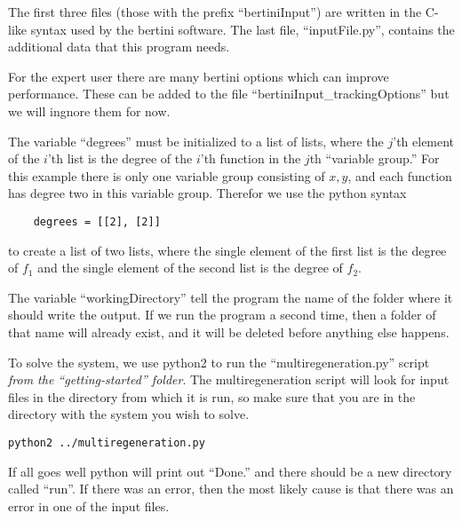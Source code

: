 \documentclass[12pt]{article}
\begin{document}
The first three files (those with the prefix ``bertiniInput'') are 
written in the C-like syntax used by the bertini software. The last 
file, ``inputFile.py'', contains the additional data that this 
program needs.

For the expert user there are many bertini options which can 
improve performance. These can be added 
to the file ``bertiniInput\_trackingOptions'' but we will ingnore them for now.

The variable ``degrees'' must be initialized to a list of lists, where 
the $j$'th element of the $i$'th list is the degree of the $i$'th 
function in the $j$th ``variable group.'' For this example there is only 
one variable group consisting of $x,y$, and each function has degree two 
in this variable group. Therefor we use the python syntax

\begin{leftbar}
\vspace{-10pt} 
\begin{verbatim}
    degrees = [[2], [2]]
\end{verbatim}\vspace{-10pt} 
\end{leftbar}
to create a list of two lists, where the single element of the first 
list is the degree of $f_1$ and the single element of the second list is 
the degree of $f_2$.

The variable ``workingDirectory'' tell the program the name of the 
folder where it should write the output. If we run the program a second 
time, then a folder of that name will already exist, and it will be 
deleted before anything else happens.

To solve the system, we use python2 to run the ``multiregeneration.py'' 
script \emph{from the ``getting-started'' folder}. The multiregeneration 
script will look for input files in the directory from which it is run, 
so make sure that you are in the directory with the system you wish to 
solve. 


\begin{leftbar}
\vspace{-10pt} 
\begin{verbatim}
python2 ../multiregeneration.py
\end{verbatim}\vspace{-10pt} 
\end{leftbar}

If all goes well python will print out ``Done.'' and there should be 
a new directory called ``run''. If there was an error, then the most 
likely cause is that there was an error in one of the input files.
\end{document}
